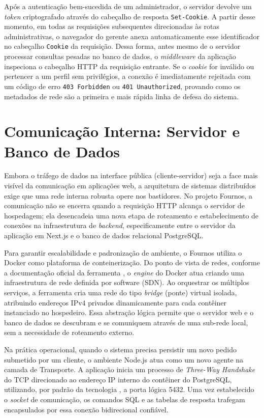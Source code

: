 \documentclass[12pt, a4paper]{article}
\begin{document}
Após a autenticação bem-sucedida de um administrador, o servidor devolve um \textit{token} criptografado através do cabeçalho de resposta \texttt{Set-Cookie}. A partir desse momento, em todas as requisições subsequentes direcionadas às rotas administrativas, o navegador do gerente anexa automaticamente esse identificador no cabeçalho \texttt{Cookie} da requisição. Dessa forma, antes mesmo de o servidor processar consultas pesadas no banco de dados, o \textit{middleware} da aplicação inspeciona o cabeçalho HTTP da requisição entrante. Se o \textit{cookie} for inválido ou pertencer a um perfil sem privilégios, a conexão é imediatamente rejeitada com um código de erro \texttt{403 Forbidden} ou \texttt{401 Unauthorized}, provando como os metadados de rede são a primeira e mais rápida linha de defesa do sistema.

\section{Comunicação Interna: Servidor e Banco de Dados}

Embora o tráfego de dados na interface pública (cliente-servidor) seja a face mais visível da comunicação em aplicações web, a arquitetura de sistemas distribuídos exige que uma rede interna robusta opere nos bastidores. No projeto Fournos, a comunicação não se encerra quando a requisição HTTP alcança o servidor de hospedagem; ela desencadeia uma nova etapa de roteamento e estabelecimento de conexões na infraestrutura de \textit{backend}, especificamente entre o servidor da aplicação em Next.js e o banco de dados relacional PostgreSQL.

Para garantir escalabilidade e padronização de ambiente, o Fournos utiliza o Docker como plataforma de conteinerização. Do ponto de vista de redes, conforme a documentação oficial da ferramenta \cite{docker-network}, o \textit{engine} do Docker atua criando uma infraestrutura de rede definida por software (SDN). Ao orquestrar os múltiplos serviços, a ferramenta cria uma rede do tipo \textit{bridge} (ponte) virtual isolada, atribuindo endereços IPv4 privados dinamicamente para cada contêiner instanciado no hospedeiro. Essa abstração lógica permite que o servidor web e o banco de dados se descubram e se comuniquem através de uma sub-rede local, sem a necessidade de roteamento externo.

Na prática operacional, quando o sistema precisa persistir um novo pedido submetido por um cliente, o ambiente Node.js atua como um novo agente na camada de Transporte. A aplicação inicia um processo de \textit{Three-Way Handshake} do TCP direcionado ao endereço IP interno do contêiner do PostgreSQL, utilizando, por padrão da tecnologia \cite{postgres-docs}, a porta lógica 5432. Uma vez estabelecido o \textit{socket} de comunicação, os comandos SQL e as tabelas de resposta trafegam encapsulados por essa conexão bidirecional confiável.
\end{document}
